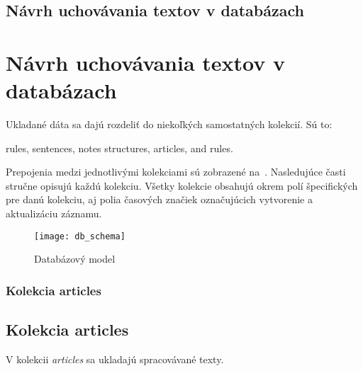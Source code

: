 %
%
{
	\subsection{Návrh uchovávania textov v databázach}
}
{
	\section{Návrh uchovávania textov v databázach}
}
\label{subsection:our_design_persisting_data}
Ukladané dáta sa dajú rozdeliť do niekoľkých samostatných kolekcií. Sú to:

\begin{my_itemize}
	\myitem rules,
	\myitem sentences,
	\myitem notes
	\myitem structures,
	\myitem articles,
	\myitem and rules.
\end{my_itemize}
	
Prepojenia medzi jednotlivými kolekciami sú zobrazené na~. Nasledujúce časti stručne opisujú každú kolekciu. Všetky kolekcie obsahujú okrem polí špecifických pre danú kolekciu, aj polia časových značiek označujúcich vytvorenie a aktualizáciu záznamu.

\begin{figure}[H]
	\begin{center}\texttt{[image: db\_schema]}\end{center}
	\caption[Databázový model]{Databázový model}\label{fig:db_schema}
\end{figure}

%
%
{
	\subsubsection{Kolekcia articles}
}
{
	\subsection{Kolekcia articles}
}
\label{subsubsection:collection_articles}
V kolekcii \textit{articles} sa ukladajú spracovávané texty. 

